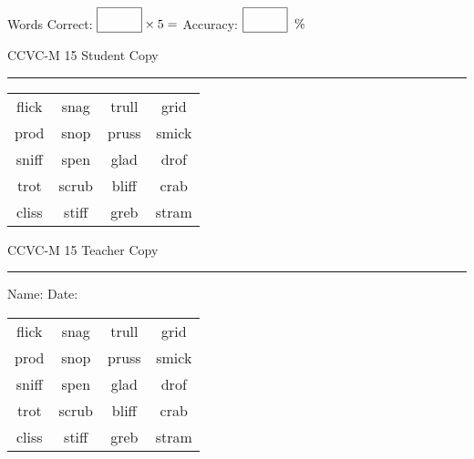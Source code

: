 \documentclass{memoir}
\begin{document}
\small

Words Correct: $\fbox{\phantom{\huge 100}} \times 5 = $ Accuracy: $\fbox{\phantom{\huge 100}}\;\; \%$ 

\vfill

\newpage


\footnotesize \noindent
CCVC-M 15 \hfill Student Copy
\smallskip
\hrule

\Large

\setlength{\tabcolsep}{14pt}
\def\arraystretch{3}

{\selectfont


\begin{vplace}[0.5]
\begin{center}
\begin{tabular}{cccc}
flick            & snag & trull & grid \\
prod & snop & pruss       & smick \\
sniff & spen & glad & drof \\
trot & scrub & bliff & crab        \\
cliss             & stiff & greb & stram \\
\end{tabular}
\end{center}
\end{vplace}

}

\newpage

\footnotesize \noindent
CCVC-M 15 \hfill Teacher Copy
\smallskip
\hrule

\small

\vfill

\noindent
Name: \underline{\hspace{1.75in}} \hfill Date: \underline{\hspace{1in}}

\Large

{\selectfont


\begin{vplace}[0.5]
\begin{center}
\begin{tabular}{cccc}
flick            & snag & trull & grid \\
prod & snop & pruss       & smick \\
sniff & spen & glad & drof \\
trot & scrub & bliff & crab        \\
cliss             & stiff & greb & stram \\
\end{tabular}
\end{center}
\end{vplace}



}
\end{document}
